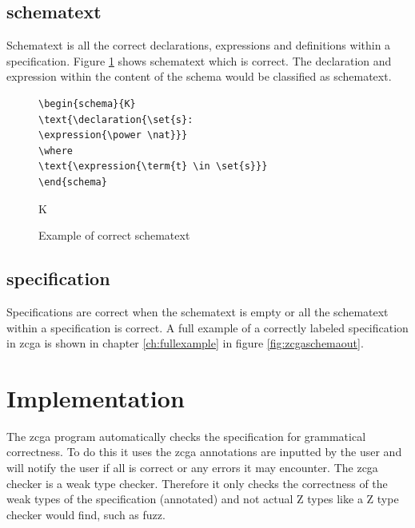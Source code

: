 \subsection{schematext}

Schematext is all the correct declarations, expressions and definitions within a
specification. Figure \ref{fig:stinzcga} shows schematext which is correct. The
declaration and expression within the content of the schema would be classified
as schematext.

\begin{figure}[H]
\centering
\begin{minipage}{0.45\textwidth}
\begin{BVerbatim}
\begin{schema}{K}
\text{\declaration{\set{s}:
\expression{\power \nat}}}
\where
\text{\expression{\term{t} \in \set{s}}}
\end{schema}
\end{BVerbatim}
\end{minipage}\hfill
\begin{minipage}{0.45\textwidth}
\begin{schema}{K}
\where
{}
\end{schema}
\end{minipage}
\caption{Example of correct schematext \label{fig:stinzcga}}
\end{figure}

\subsection{specification}

Specifications are correct when the schematext is empty or all the schematext
within a specification is correct. A full example of a correctly labeled
specification in \gls{zcga} is shown in chapter \ref{ch:fullexample} in figure
\ref{fig:zcgaschemaout}.

\section{Implementation}

The \gls{zcga} program automatically checks the specification for grammatical
correctness. To do this it uses the \gls{zcga} annotations are inputted by the user
and will notify the user if all is correct or any errors it may encounter. The
\gls{zcga} checker is a weak type checker. Therefore it only checks the
correctness of the weak types of the specification (annotated) and not actual Z
types like a Z type checker would find, such as fuzz.

